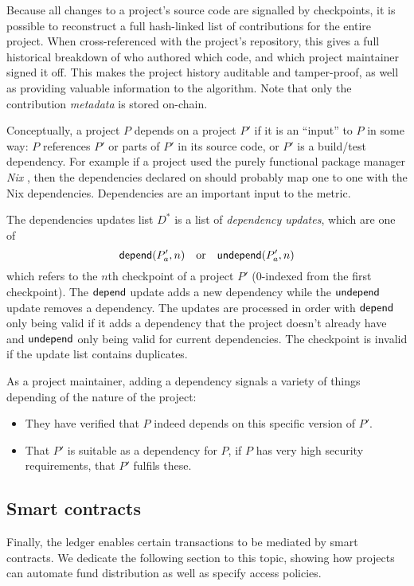 Because all changes to a project's source code are signalled by checkpoints, it
is possible to reconstruct a full hash-linked list of contributions for the
entire project. When cross-referenced with the project's repository, this gives
a full historical breakdown of who authored which code, and which project
maintainer signed it off.  This makes the project history auditable and
tamper-proof, as well as providing valuable information to the \osrank{}
algorithm. Note that only the contribution \emph{metadata} is stored on-chain.

\label{s:dependencies}
Conceptually, a project $P$ depends on a project $P'$ if it is an
``input'' to $P$ in some way: $P$ references $P'$ or parts of
$P'$ in its source code, or $P'$ is a build/test dependency.
For example if a project used the purely functional package
manager \emph{Nix} \cite{nix}, then the dependencies declared on
\oscoin{} should probably map one to one with the Nix
dependencies. Dependencies are an important input to the \osrank{}
metric.

The dependencies updates list $D^*$ is a list of \emph{dependency
  updates}, which are one of
\[
    \mathsf{depend}(P'_a, n) \quad \text{or} \quad \mathsf{undepend}(P'_a, n)
\]
which refers to the $n$th checkpoint of a project $P'$ ($0$-indexed
from the first checkpoint). The $\mathsf{depend}$ update adds a new dependency
while the $\mathsf{undepend}$ update removes a dependency. The updates are
processed in order with $\mathsf{depend}$ only being valid if it adds a
dependency that the project doesn't already have and $\mathsf{undepend}$
only being valid for current dependencies. The checkpoint is invalid
if the update list contains duplicates.

As a project maintainer, adding a dependency signals a variety of things
depending of the nature of the project:
\begin{itemize}
\item They have verified that $P$ indeed depends on this specific
  version of $P'$.
\item That $P'$ is suitable as a dependency for $P$, \eg{} if $P$ has
  very high security requirements, that $P'$ fulfils these.
\end{itemize}

\subsection{Smart contracts}

Finally, the ledger enables certain transactions to be mediated by smart contracts.
We dedicate the following section to this topic, showing how projects can automate
fund distribution as well as specify access policies.


